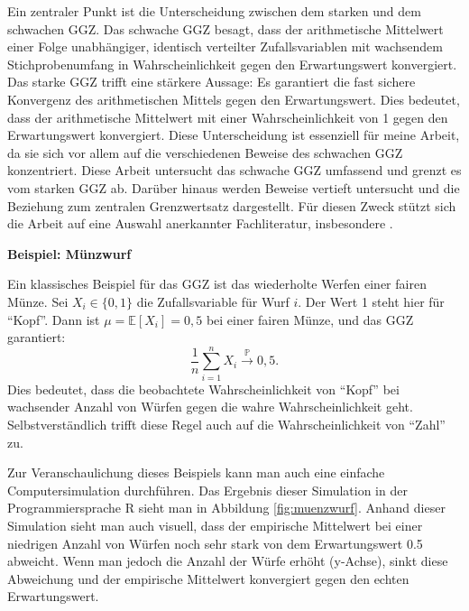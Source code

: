 \documentclass[aodsor,preprint]{imsart}
\numberwithin{equation}{section}
\theoremstyle{plain}
\begin{document}
Ein zentraler Punkt ist die Unterscheidung zwischen dem starken und dem schwachen GGZ.
Das schwache GGZ besagt, dass der arithmetische Mittelwert einer Folge unabhängiger, identisch verteilter Zufallsvariablen mit wachsendem Stichprobenumfang in Wahrscheinlichkeit gegen den Erwartungswert konvergiert.
Das starke GGZ trifft eine stärkere Aussage: Es garantiert die fast sichere Konvergenz des arithmetischen Mittels gegen den Erwartungswert.
Dies bedeutet, dass der arithmetische Mittelwert mit einer Wahrscheinlichkeit von 1 gegen den Erwartungswert konvergiert.
Diese Unterscheidung ist essenziell für meine Arbeit, da sie sich vor allem auf die verschiedenen Beweise des schwachen GGZ konzentriert.
Diese Arbeit untersucht das schwache GGZ umfassend und grenzt es vom starken GGZ ab.
Darüber hinaus werden Beweise vertieft untersucht und die Beziehung zum zentralen Grenzwertsatz dargestellt.
Für diesen Zweck stützt sich die Arbeit auf eine Auswahl anerkannter Fachliteratur, insbesondere \citet{degroot2021, blitzstein2019, stoyanov2013}.

\newpage


\textbf{Beispiel: Münzwurf}

Ein klassisches Beispiel für das GGZ ist das wiederholte Werfen einer fairen Münze.
Sei \( X_i \in \{0,1\} \) die Zufallsvariable für Wurf \( i \). Der Wert 1 steht hier für \enquote{Kopf}. Dann ist \( \mu = \mathbb{E}[X_i] = 0{,}5 \) bei einer fairen Münze, und das GGZ garantiert:
\[
\frac{1}{n} \sum_{i=1}^n X_i \xrightarrow{\mathbb{P}} 0{,}5.
\]
Dies bedeutet, dass die beobachtete Wahrscheinlichkeit von \enquote{Kopf} bei wachsender Anzahl von Würfen gegen die wahre Wahrscheinlichkeit geht.
Selbstverständlich trifft diese Regel auch auf die Wahrscheinlichkeit von \enquote{Zahl} zu. 

Zur Veranschaulichung dieses Beispiels kann man auch eine einfache Computersimulation durchführen.
Das Ergebnis dieser Simulation in der Programmiersprache R sieht man in Abbildung \ref{fig:muenzwurf}.
Anhand dieser Simulation sieht man auch visuell, dass der empirische Mittelwert bei einer niedrigen Anzahl von Würfen noch sehr stark von dem Erwartungswert 0.5 abweicht.
Wenn man jedoch die Anzahl der Würfe erhöht (y-Achse), sinkt diese Abweichung und der empirische Mittelwert konvergiert gegen den echten Erwartungswert.
\end{document}
